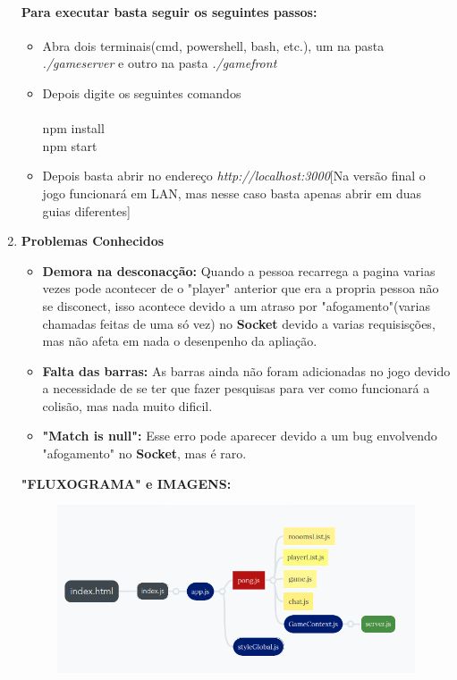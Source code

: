 \documentclass[12pt,openright,oneside,a4paper,brazil,article]{abntex2}
\begin{document}
\begin{enumerate}
    \paragraph*{Para executar basta seguir os seguintes passos:}
    \begin{itemize}
      \item Abra dois terminais(cmd, powershell, bash, etc.), um na pasta \textit{./gameserver} e outro na pasta \textit{./gamefront}
      
      \item Depois digite os seguintes comandos\\\\
      npm install
      \\
      npm start

      \item Depois basta abrir no endereço \textit{http://localhost:3000}[Na versão final o jogo funcionará em LAN, mas nesse caso basta apenas abrir em duas guias diferentes]
    \end{itemize}
    \item \textbf{Problemas Conhecidos}
    \begin{itemize}
      \item \textbf{Demora na desconacção:} Quando a pessoa recarrega a pagina varias vezes pode acontecer de o "player" anterior que 
      era a propria pessoa não se disconect, isso acontece devido a um atraso por "afogamento"(varias chamadas feitas de uma só vez) no \textbf{Socket} devido a varias requisisções, 
      mas não afeta em nada o desenpenho da apliação.
      \item \textbf{Falta das barras:} As barras ainda não foram adicionadas no jogo devido a necessidade de se ter que fazer pesquisas para ver
      como funcionará a colisão, mas nada muito dificil.
      \item \textbf{"Match is null":} Esse erro pode aparecer devido a um bug envolvendo "afogamento" no \textbf{Socket}, mas é raro.
    \end{itemize} 
    
    \textbf{"FLUXOGRAMA" e IMAGENS:}
    \begin{center}
      \begin{figure}
        \includegraphics[scale=0.5]{fluxograma.png}
      \end{figure}  
    \end{center}


\end{enumerate}
\end{document}
